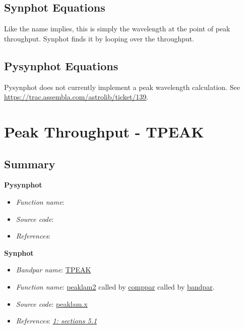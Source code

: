 \documentclass[letterpaper,10pt,english]{sphinxtsr}
\begin{document}
\section{Synphot Equations}
\label{main:id24}
Like the name implies, this is simply the wavelength at the point of peak
throughput. Synphot finds it by looping over the throughput.


\section{Pysynphot Equations}
\label{main:id25}
Pysynphot does not currently implement a peak wavelength calculation.
See \href{https://trac.assembla.com/astrolib/ticket/139}{https://trac.assembla.com/astrolib/ticket/139}.


\chapter{Peak Throughput - TPEAK}
\label{main:peak-throughput-tpeak}

\section{Summary}
\label{main:id26}
\textbf{Pysynphot}
\begin{itemize}
\item {} 
\emph{Function name}:

\item {} 
\emph{Source code}:

\item {} 
\emph{References}:

\end{itemize}

\textbf{Synphot}
\begin{itemize}
\item {} 
\emph{Bandpar name}: \href{https://svn.stsci.edu/trac/ssb/stsci\_python/browser/stsdas/trunk/stsdas/pkg/hst\_calib/synphot/doc/bandpar.hlp}{TPEAK}

\item {} 
\emph{Function name}: \href{https://svn.stsci.edu/trac/ssb/stsci\_python/browser/stsdas/trunk/stsdas/pkg/hst\_calib/synphot/newlib/peaklam.x}{peaklam2}
called by \href{https://svn.stsci.edu/trac/ssb/stsci\_python/browser/stsdas/trunk/stsdas/pkg/hst\_calib/synphot/bandpar/comppar.x}{comppar} called by \href{https://svn.stsci.edu/trac/ssb/stsci\_python/browser/stsdas/trunk/stsdas/pkg/hst\_calib/synphot/bandpar/bandpar.x}{bandpar}.

\item {} 
\emph{Source code}: \href{https://svn.stsci.edu/trac/ssb/stsci\_python/browser/stsdas/trunk/stsdas/pkg/hst\_calib/synphot/newlib/peaklam.x}{peaklam.x}

\item {} 
\emph{References}: {\hyperref[references:ref1]{\emph{1: sections 5.1}}}

\end{itemize}
\end{document}
